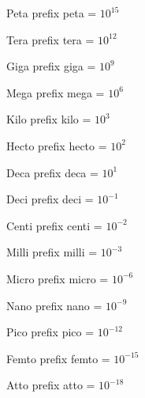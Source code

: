 \begin{datadesc}{Peta}
prefix peta = $10^{15}$
\end{datadesc}

\begin{datadesc}{Tera}
prefix tera = $10^{12}$
\end{datadesc}

\begin{datadesc}{Giga}
prefix giga = $10^9$
\end{datadesc}

\begin{datadesc}{Mega}
prefix mega = $10^6$
\end{datadesc}

\begin{datadesc}{Kilo}
prefix kilo = $10^3$
\end{datadesc}

\begin{datadesc}{Hecto}
prefix hecto = $10^2$
\end{datadesc}

\begin{datadesc}{Deca}
prefix deca = $10^1$
\end{datadesc}

\begin{datadesc}{Deci}
prefix deci = $10^{-1}$
\end{datadesc}

\begin{datadesc}{Centi}
prefix centi = $10^{-2}$
\end{datadesc}

\begin{datadesc}{Milli}
prefix milli = $10^{-3}$
\end{datadesc}

\begin{datadesc}{Micro}
prefix micro = $10^{-6}$
\end{datadesc}

\begin{datadesc}{Nano}
prefix nano = $10^{-9}$
\end{datadesc}

\begin{datadesc}{Pico}
prefix pico = $10^{-12}$
\end{datadesc}

\begin{datadesc}{Femto}
prefix femto = $10^{-15}$
\end{datadesc}

\begin{datadesc}{Atto}
prefix atto = $10^{-18}$
\end{datadesc}

